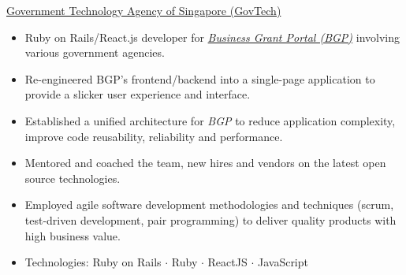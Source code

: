 \documentclass[]{cv} %
\begin{document}
\entry
{\href{https://www.tech.gov.sg/}{Government Technology Agency of Singapore (GovTech)}}
{
\begin{itemize}
\item Ruby on Rails/React.js developer for \href{https://www.businessgrants.gov.sg/}{\emph{Business Grant Portal (BGP)}} involving various government agencies.
\item Re-engineered BGP's frontend/backend into a single-page application to provide a slicker user experience and interface.
\item Established a unified architecture for \emph{BGP} to reduce application complexity, improve code reusability, reliability and performance.
\item Mentored and coached the team, new hires and vendors on the latest open source technologies.
\item Employed agile software development methodologies and techniques (scrum, test-driven development, pair programming) to deliver quality products with high business value.
\item Technologies: Ruby on Rails $\cdot$ Ruby $\cdot$ ReactJS $\cdot$ JavaScript
\end{itemize}
}



\end{document}
